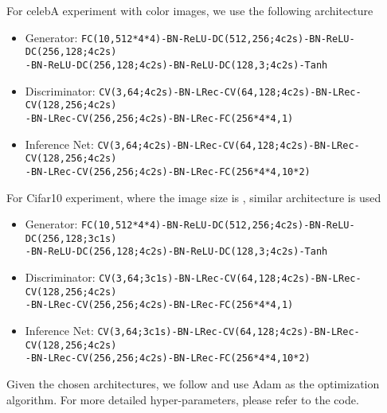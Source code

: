 \documentclass[a4paper]{article}
\begin{document}
For celebA experiment with  color images, we use the following architecture 
{\footnotesize
\begin{itemize}[leftmargin=16pt,labelindent=16pt]
\item Generator: \texttt{FC(10,512*4*4)-BN-ReLU-DC(512,256;4c2s)-BN-ReLU-DC(256,128;4c2s)}\\ 
\texttt{-BN-ReLU-DC(256,128;4c2s)-BN-ReLU-DC(128,3;4c2s)-Tanh}
\item Discriminator: \texttt{CV(3,64;4c2s)-BN-LRec-CV(64,128;4c2s)-BN-LRec-CV(128,256;4c2s)}\\ 
\texttt{-BN-LRec-CV(256,256;4c2s)-BN-LRec-FC(256*4*4,1)}
\item Inference Net: \texttt{CV(3,64;4c2s)-BN-LRec-CV(64,128;4c2s)-BN-LRec-CV(128,256;4c2s)}\\ 
\texttt{-BN-LRec-CV(256,256;4c2s)-BN-LRec-FC(256*4*4,10*2)}
\end{itemize}}
For Cifar10 experiment, where the image size is , similar architecture is used
{\footnotesize
\begin{itemize}[leftmargin=16pt,labelindent=16pt]
\item Generator: \texttt{FC(10,512*4*4)-BN-ReLU-DC(512,256;4c2s)-BN-ReLU-DC(256,128;3c1s)}\\ 
\texttt{-BN-ReLU-DC(256,128;4c2s)-BN-ReLU-DC(128,3;4c2s)-Tanh}
\item Discriminator: \texttt{CV(3,64;3c1s)-BN-LRec-CV(64,128;4c2s)-BN-LRec-CV(128,256;4c2s)}\\ 
\texttt{-BN-LRec-CV(256,256;4c2s)-BN-LRec-FC(256*4*4,1)}
\item Inference Net: \texttt{CV(3,64;3c1s)-BN-LRec-CV(64,128;4c2s)-BN-LRec-CV(128,256;4c2s)}\\ 
\texttt{-BN-LRec-CV(256,256;4c2s)-BN-LRec-FC(256*4*4,10*2)}
\end{itemize}}

Given the chosen architectures, we follow \citet{radford2015unsupervised} and use Adam as the optimization algorithm.
For more detailed hyper-parameters, please refer to the code.
\end{document}
